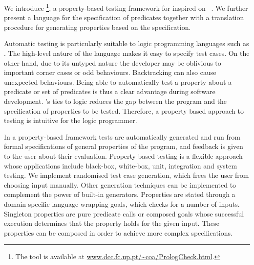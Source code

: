 We introduce \plqc{}\footnote{The \plqc{} tool is available at \url{www.dcc.fc.up.pt/~coa/PrologCheck.html}.},
a property-based testing framework for \Prolog{} inspired on
 \QuickCheck~\cite{quickcheck}.
%
We further present a language for the specification of \Prolog{} predicates
together with a translation procedure for generating \plqc{} properties
based on the specification.


Automatic testing is particularly suitable to logic programming languages such as
\Prolog{}. The high-level nature of the language makes it easy to
specify test cases.
%
On the other hand, due to its untyped nature the developer may be
oblivious to important corner cases or odd behaviours.
%
Backtracking can also cause unexpected behaviours. %
%
Being able to automatically test a property about a predicate or set of
predicates is thus a clear advantage during software development.
%
\Prolog{}'s ties to logic reduces the gap between the program and the
specification of properties to be tested.
%
Therefore, a property based approach to testing is intuitive for the
logic programmer.

In a property-based framework tests are automatically generated and run from formal specifications of general
properties of the program, and feedback is given to the user about their
evaluation.
%
Property-based testing is a flexible approach whose applications include
black-box, white-box, unit, integration and system testing.
%
We implement randomised test case generation, which frees the user
from choosing input manually.
%
Other generation techniques
\cite{naylor2007logic,runciman2008smallcheck,Duregard-2012-feat} can be
implemented to complement the power of built-in generators.
%
Properties are stated through a domain-specific language wrapping
\Prolog{} goals, which \plqc{} checks for a number of inputs. %
%
Singleton properties are pure predicate calls
or composed goals whose successful execution determines that the
property holds for the given input.
%
These properties can be composed in order to achieve more complex
specifications.


